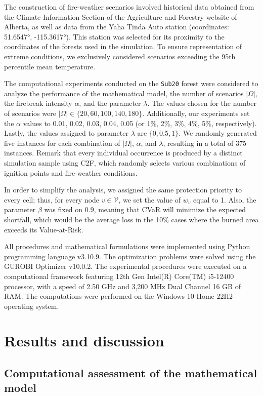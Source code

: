 \documentclass[a4paper,fleqn]{cas-sc}
\begin{document}
The construction of fire-weather scenarios involved historical data obtained from the Climate Information Section of the Agriculture and Forestry website of Alberta, as well as data from the Yaha Tinda Auto station (coordinates: 51.6547°, -115.3617°). This station was selected for its proximity to the coordinates of the forests used in the simulation. To ensure representation of extreme conditions, we exclusively considered scenarios exceeding the 95th percentile mean temperature.

The computational experiments conducted on the \texttt{Sub20} forest were considered to analyze the performance of the mathematical model, the number of scenarios $|\Omega|$, the firebreak intensity $\alpha$, and the parameter $\lambda$. The values chosen for the number of scenarios were $|\Omega| \in \{ 20, 60, 100, 140, 180 \}$. Additionally, our experiments set the $\alpha$ values to 0.01, 0.02, 0.03, 0.04, 0.05 (or 1\%, 2\%, 3\%, 4\%, 5\%, respectively). Lastly, the values assigned to parameter $\lambda$ are $ \{0, 0.5, 1 \}$. We randomly generated five instances for each combination of $|\Omega|$, $\alpha$, and $\lambda$, resulting in a total of 375 instances. Remark that every individual occurrence is produced by a distinct simulation sample using C2F, which randomly selects various combinations of ignition points and fire-weather conditions.

In order to simplify the analysis, we assigned the same protection priority to every cell; thus, for every node $v \in \mathcal{V}$, we set the value of $w_v$ equal to 1. Also, the parameter $\beta$ was fixed on 0.9, meaning that CVaR will minimize the expected shortfall, which would be the average loss in the 10\% cases where the burned area exceeds its Value-at-Risk.

All procedures and mathematical formulations were implemented using Python programming language v3.10.9. The optimization problems were solved using the GUROBI Optimizer v10.0.2. The experimental procedures were executed on a computational framework featuring 12th Gen Intel(R) Core(TM) i5-12400 processor, with a speed of 2.50 GHz and 3,200 MHz Dual Channel 16 GB of RAM. The computations were performed on the Windows 10 Home 22H2 operating system.

\section{Results and discussion}
\label{S:4}


\subsection{Computational assessment of the mathematical model}
\end{document}
